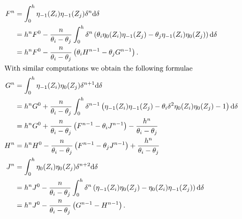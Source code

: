 \begin{align*}
  F^{n} & = \int_{0}^{h}\eta_{-1}(Z_i)\eta_{-1}(Z_j) \delta^{n} \dd \delta                                                                                    \\
        & =h^{n} F^0 - \frac{n}{\theta_i - \theta_j}\int_{0}^{h} \delta^{n} \left( \theta_i \eta_{0}(Z_i)\eta_{-1}(Z_j)
  - \theta_j \eta_{-1}(Z_i)\eta_{0}(Z_j) \right) \dd \delta                                                                                                   \\
        & =h^{n} F^0 - \frac{n}{\theta_i-\theta_j}\left(\theta_i H^{n-1} - \theta_j G^{n-1}\right)\text{.}                                                    \\
  \intertext{With similar computations we obtain the following formulae}
  G^{n} & = \int_{0}^{h}\eta_{-1}(Z_i)\eta_{0}(Z_j) \delta^{n+1} \dd \delta                                                                                   \\
        & = h^{n} G^0 + \frac{n}{\theta_i - \theta_j}\int_0^h \delta^{n-1} \left( \eta_{-1}(Z_i)\eta_{-1}(Z_j)
  - \theta_i\delta^2 \eta_{0}(Z_i)\eta_{0}(Z_j)  - 1 \right) \dd \delta                                                                                       \\
        & = h^{n} G^0 + \frac{n}{\theta_i - \theta_j}\left( F^{n-1} - \theta_i J^{n-1}\right) - \frac{h^{n}}{\theta_i - \theta_j}                             \\
  H^{n} & = h^{n} H^0 - \frac{n }{\theta_i - \theta_j}\left( F^{n-1} - \theta_j J^{n-1}\right) + \frac{h^{n}}{\theta_i - \theta_j}                            \\
  J^{n} & = \int_{0}^{h}\eta_{0}(Z_i)\eta_{0}(Z_j) \delta^{n+2} \dd \delta                                                                                    \\
        & = h^{n} J^0 - \frac{n }{\theta_i - \theta_j}\int_0^h \delta^{n} \left( \eta_{-1}(Z_i)\eta_{0}(Z_j) - \eta_{0}(Z_i)\eta_{-1}(Z_j) \right) \dd \delta \\
        & = h^{n} J^0 - \frac{n }{\theta_i - \theta_j}\left( G^{n-1} - H^{n-1} \right)\text{.}
\end{align*}


